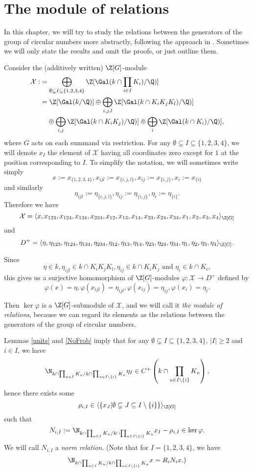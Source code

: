 \chapter{The module of relations}
In this chapter, we will try to study the relations between the generators of the group of circular numbers more abstractly, following the approach in \citep{Kucera2016}. Sometimes we will only state the results and omit the proofs, or just outline them.%

Consider the (additively written) $\Z[G]$-module
\begin{align*}
\mathcal{X}:&=\bigoplus_{\emptyset\subsetneq I \subseteq \{1,2,3,4\}} \Z[\Gal(k\cap \prod_{i\in I}K_i)/\Q)]\\
&=\Z[\Gal(k/\Q)] \oplus \bigoplus_{i,j,l} \Z[\Gal(k\cap K_iK_jK_l)/\Q)]\\
&\hphantom{{}=} \oplus \bigoplus_{i,j} \Z[\Gal(k\cap K_iK_j)/\Q)]\oplus \bigoplus_{i} \Z[\Gal(k\cap K_i)/\Q)],
\end{align*}
where $G$ acts on each summand via restriction. For any $\emptyset\subsetneq I \subseteq \{1,2,3,4\}$, we will denote $x_I$ the element of $\mathcal{X}$ having all coordinates zero except for $1$ at the position corresponding to $I$. To simplify the notation, we will sometimes write simply $$x:=x_{\{1,2,3,4\}},x_{ijl}:=x_{\{i,j,l\}},x_{ij}:=x_{\{i,j\}},x_{i}:=x_{\{i\}}$$ and similarly $$\eta_{ijl}:=\eta_{\{i,j,l\}},\eta_{ij}:=\eta_{\{i,j\}},\eta_{i}:=\eta_{\{i\}}.$$
Therefore we have 
$$\mathcal{X}=\langle x,x_{123},x_{124},x_{134},x_{234}, x_{12},x_{13},x_{14},x_{23},x_{24},x_{34},x_{1},x_{2},x_{3},x_{4}\rangle_{\Z[G]}$$
and
$$D^+=\langle \eta,\eta_{123},\eta_{124},\eta_{134},\eta_{234}, \eta_{12},\eta_{13},\eta_{14},\eta_{23},\eta_{24},\eta_{34},\eta_{1},\eta_{2},\eta_{3},\eta_{4}\rangle_{\Z[G]}.$$

Since $$\eta\in k, \eta_{ijl}\in k\cap K_iK_jK_l, \eta_{ij}\in k\cap K_iK_j \text{ and } \eta_{i}\in k\cap K_i,$$ this gives us a surjective homomorphism of $\Z[G]$-modules $\varphi:\mathcal{X}\to D^+$ defined by $$\varphi(x)=\eta, \varphi(x_{ijl})=\eta_{ijl}, \varphi(x_{ij})=\eta_{ij}, \varphi(x_{i})=\eta_{i}.$$

Then $\ker\varphi$ is a $\Z[G]$-submodule of $\mathcal{X}$, and we will call it \textit{the module of relations}, because we can regard its elements as the relations between the generators of the group of circular numbers.

Lemmas \ref{units} and \ref{NoFrob} imply that for any $\emptyset\subsetneq I \subseteq \{1,2,3,4\}$, $|I|\geq 2$ and $i\in I$, we have
$$\N_{k\cap \prod_{u\in I}K_u/ k \cap \prod_{u\in I\setminus{\{i\}}}K_u} \eta_I\in C^+\left( k \cap \prod_{u\in I\setminus{\{i\}}}K_u\right),$$
hence there exists some $$\rho_{i,I}\in \langle \{x_J | \emptyset\subsetneq J \subseteq I \setminus{\{i\}} \}\rangle_{\Z[G]}$$
 such that $$N_{i,I}:=\N_{k\cap \prod_{u\in I}K_u/ k \cap \prod_{u\in I\setminus{\{i\}}}K_u}x_I-\rho_{i,I} \in \ker \varphi.$$
 We will call $N_{i,I}$ a \textit{norm relation}.
 (Note that for $I=\{1,2,3,4\}$, we have $$\N_{k\cap \prod_{u\in I}K_u/ k \cap \prod_{u\in I\setminus{\{i\}}}K_u}x=R_iN_i x.)$$


